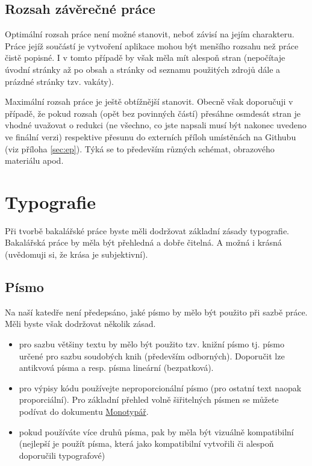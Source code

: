 \documentclass[male,czech,api_bc]{kitheses}
\begin{document}
\section{Rozsah závěrečné práce}

Optimální rozsah  práce není možné stanovit, neboť závisí na jejím charakteru. Práce jejíž součástí je vytvoření aplikace mohou být menšího rozsahu než práce čistě popisné. I v tomto případě by však měla mít alespoň  stran (nepočítaje úvodní stránky až po obsah a stránky od seznamu použitých zdrojů dále a prázdné stránky tzv. vakáty).

Maximální rozsah práce je ještě obtížnější stanovit. Obecně však doporučuji v případě, že pokud rozsah (opět bez povinných částí) přesáhne osmdesát stran je vhodné uvažovat o redukci (ne všechno, co jste napsali musí být nakonec uvedeno ve finální verzi) respektive přesunu do externích příloh umístěnách na Githubu (viz příloha \vref{sec:ep}). Týká se to především různých schémat, obrazového materiálu apod.

\chapter{Typografie}

Při tvorbě bakalářské práce byste měli dodržovat základní zásady typografie. Bakalářská práce by měla být přehledná a dobře čitelná. A možná i krásná (uvědomuji si, že krása je subjektivní).

\section{Písmo}

Na naší katedře není předepsáno, jaké písmo by mělo být použito při sazbě práce. Měli byste však dodržovat několik zásad.

\begin{itemize}
\item pro sazbu většiny textu by mělo být použito tzv. knižní písmo tj. písmo určené
pro sazbu soudobých knih (především odborných). Doporučit lze antikvová písma a resp. písma lineární (bezpatková).
\item pro výpisy kódu používejte neproporcionální písmo (pro ostatní text naopak proporciální). Pro základní přehled 
volně šiřitelných písmen se můžete podívat do dokumentu \href{https://github.com/Jiri-Fiser/thesis_ki_ujep/blob/main/monotyp%C3%A1%C5%99.pdf}{Monotypář}.
\item pokud používáte více druhů písma, pak by měla být vizuálně kompatibilní (nejlepší je použít písma, která jako kompatibilní vytvořili či alespoň doporučili typografové)
\end{itemize}
\end{document}
